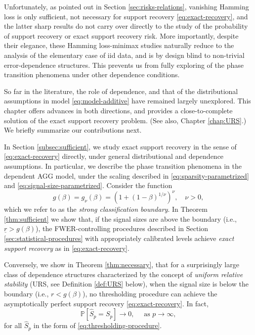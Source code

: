 Unfortunately, as pointed out in Section \ref{sec:risks-relations}, vanishing Hamming loss is only sufficient, not necessary for support recovery \eqref{eq:exact-recovery}, and the latter sharp results do not carry over directly to the study of the probability of support recovery or exact support recovery risk.
More importantly, despite their elegance, these Hamming loss-minimax studies naturally reduce to the analysis of the elementary case of iid data, and is by design blind to non-trivial error-dependence structures.
This prevents us from fully exploring of the phase transition phenomena under other dependence conditions.

So far in the literature, the role of dependence, and that of the distributional assumptions in model 
\eqref{eq:model-additive} have remained largely unexplored.  This chapter offers advances in both directions, and provides a close-to-complete solution of the exact support recovery problem. (See also, Chapter \ref{chap:URS}.)
We briefly summarize our contributions next.


\medskip
In Section \ref{subsec:sufficient}, we study exact support recovery in the sense of \eqref{eq:exact-recovery} directly, under general 
distributional and dependence assumptions.  In particular, we describe the phase transition phenomena in the dependent AGG model, under the scaling described in \eqref{eq:sparsity-parametrized} and \eqref{eq:signal-size-parametrized}.
Consider the function
\begin{equation} \label{eq:strong-classification-boundary}
    g(\beta) = g_\nu(\beta) = (1 + (1 - \beta)^{1/\nu})^\nu, \quad \nu>0,
\end{equation}
which we refer to as the {\em strong classification boundary}.
In Theorem \ref{thm:sufficient} we show that, 
if the signal sizes are above the boundary (i.e., $\underline{r}> g(\beta)$), the \ac{FWER}-controlling procedures described in Section \ref{sec:statistical-procedures} with appropriately calibrated levels achieve \emph{exact support recovery} as in \eqref{eq:exact-recovery}.

Conversely, we show in Theorem \ref{thm:necessary}, that for a surprisingly large class of dependence structures characterized by the concept of \emph{uniform relative stability} (URS, see Definition \ref{def:URS} below), when the signal size is below the boundary  (i.e., $r<g(\beta)$), no thresholding procedure can achieve the asymptotically perfect support recovery \eqref{eq:exact-recovery}. In fact,
\begin{equation} \label{eq:exact-recovery-failure}
    \mathbb{P}\left[\widehat{S}_p=S_p\right]\longrightarrow 0,\quad \mbox{ as }p\to \infty,
\end{equation}
for all $\widehat{S}_p$ in the form of \eqref{eq:thresholding-procedure}.


